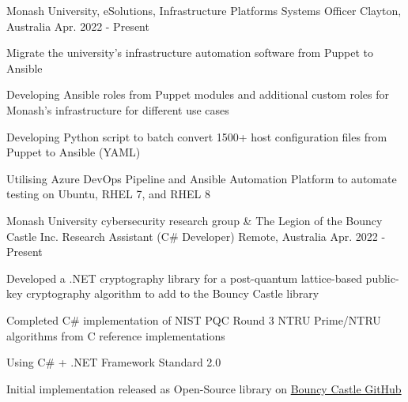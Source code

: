 

\begin{cventries}

  \cventry
  {Monash University, eSolutions, Infrastructure Platforms} %
  {Systems Officer} %
  {Clayton, Australia} %
  {Apr. 2022 - Present} %
  {
    \begin{cvitems} %
      \item {Migrate the university's infrastructure automation software from Puppet to Ansible}
      \item {Developing Ansible roles from Puppet modules and additional custom roles for Monash's infrastructure for different use cases}
      \item {Developing Python script to batch convert 1500+ host configuration files from Puppet to Ansible (YAML)}
      \item {Utilising Azure DevOps Pipeline and Ansible Automation Platform to automate testing on Ubuntu, RHEL 7, and RHEL 8}
    \end{cvitems}
  }

  \cventry
    {Monash University cybersecurity research group \& The Legion of the Bouncy Castle Inc.} %
    {Research Assistant (C\# Developer)} %
    {Remote, Australia} %
    {Apr. 2022 - Present} %
    {
      \begin{cvitems} %
        \item {Developed a .NET cryptography library for a post-quantum lattice-based public-key cryptography algorithm to add to the Bouncy Castle library}
        \item {Completed C\# implementation of NIST PQC Round 3 NTRU Prime/NTRU algorithms from C reference implementations}
        \item {Using C\# + .NET Framework Standard 2.0}
        \item {Initial implementation released as Open-Source library on \href{https://github.com/bcgit/bc-csharp}{Bouncy Castle GitHub}}
      \end{cvitems}
    }


\end{cventries}
\vspace{-3.0mm}